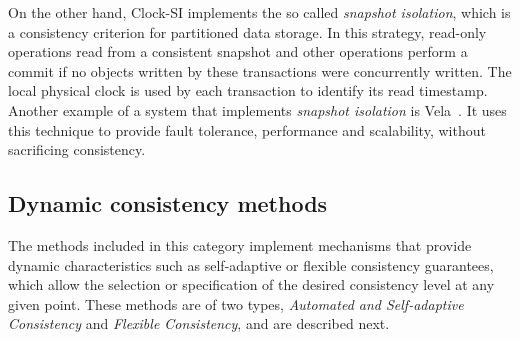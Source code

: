 On the other hand, Clock-SI implements the so called \textit{snapshot isolation}, which is a consistency criterion for partitioned data storage. In this strategy, read-only operations read from a consistent snapshot and other operations perform a commit if no objects written by these transactions were concurrently written. The local physical clock is used by each transaction to identify its read timestamp. Another example of a system that implements \textit{snapshot isolation} is Vela~\cite{salomie2015scaling}. It uses this technique to provide fault tolerance, performance and scalability, without sacrificing consistency.

\subsection{Dynamic consistency methods}

The methods included in this category implement mechanisms that provide dynamic characteristics such as self-adaptive 
or flexible consistency guarantees, which allow the selection or specification of the desired consistency level at any given point. 
These methods are of two types, \textit{Automated and Self-adaptive Consistency} and \textit{Flexible Consistency}, and are described next.

